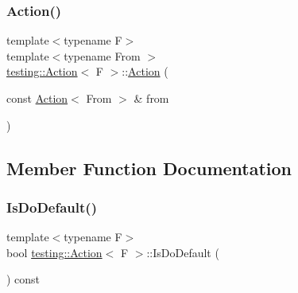 \mbox{\label{classtesting_1_1_action_af23eef2fff5a92d8ff2ed7ac7a542005}} 
\subsubsection{\texorpdfstring{Action()}{Action()}\hspace{0.1cm}{\footnotesize\ttfamily [12/12]}}
{\footnotesize\ttfamily template$<$typename F$>$ \\
template$<$typename From $>$ \\
\mbox{\hyperlink{classtesting_1_1_action}{testing\+::\+Action}}$<$ F $>$\+::\mbox{\hyperlink{classtesting_1_1_action}{Action}} (\begin{DoxyParamCaption}\item[{const \mbox{\hyperlink{classtesting_1_1_action}{Action}}$<$ From $>$ \&}]{from }\end{DoxyParamCaption})}



\subsection{Member Function Documentation}
\mbox{\label{classtesting_1_1_action_a4468ca2ea5e9f7363271145992d09dba}} 
\subsubsection{\texorpdfstring{IsDoDefault()}{IsDoDefault()}\hspace{0.1cm}{\footnotesize\ttfamily [1/3]}}
{\footnotesize\ttfamily template$<$typename F$>$ \\
bool \mbox{\hyperlink{classtesting_1_1_action}{testing\+::\+Action}}$<$ F $>$\+::Is\+Do\+Default (\begin{DoxyParamCaption}{ }\end{DoxyParamCaption}) const\hspace{0.3cm}{\ttfamily [inline]}}

\mbox{\label{classtesting_1_1_action_a4468ca2ea5e9f7363271145992d09dba}} 
